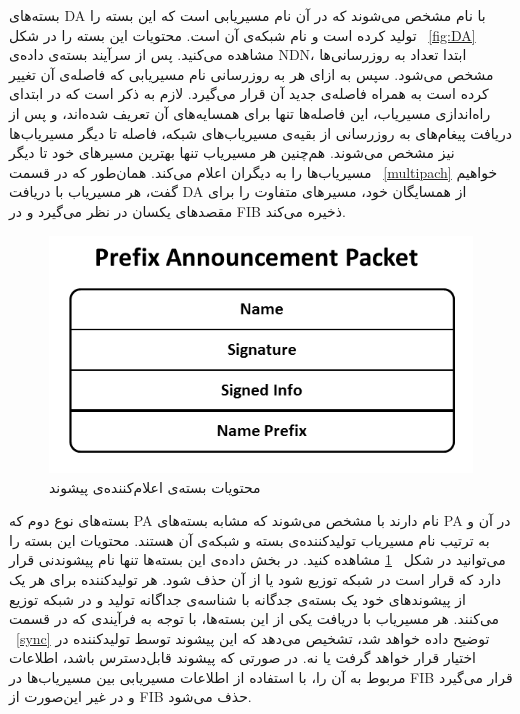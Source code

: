 بسته‌های DA با نام  مشخص می‌شوند که در آن  نام مسیریابی است که این بسته را تولید کرده است و  نام شبکه‌ی آن است. محتویات این بسته را در شکل ~\ref{fig:DA} مشاهده می‌کنید. پس از سرآیند بسته‌ی داده‌ی NDN، ابتدا تعداد به روزرسانی‌ها مشخص می‌شود. سپس به ازای هر به روزرسانی نام مسیریابی که فاصله‌ی آن تغییر کرده است به همراه فاصله‌ی جدید آن قرار می‌گیرد. لازم به ذکر است که در ابتدای راه‌اندازی مسیریاب، این فاصله‌ها تنها برای همسایه‌های آن تعریف شده‌اند، و پس از دریافت پیغام‌های به روزرسانی از بقیه‌ی مسیریاب‌های شبکه، فاصله تا دیگر مسیریاب‌ها نیز مشخص می‌شوند. هم‌چنین هر مسیریاب تنها بهترین مسیرهای خود تا دیگر مسیریاب‌ها را به دیگران اعلام می‌کند. همان‌طور که در قسمت ‍~\ref{multipach} خواهیم گفت، هر مسیریاب با دریافت DA از همسایگان خود، مسیرهای متفاوت را برای مقصد‌های یکسان در نظر می‌گیرد و در FIB ذخیره می‌کند.


\begin{figure}[hb!]
\centering
\includegraphics[scale=0.6]{./resources/figures/PA.png}
\caption{محتویات بسته‌ی اعلام‌کننده‌ی پیشوند}
\label{fig:PA}
\end{figure}

بسته‌های نوع دوم که PA نام دارند با  مشخص می‌شوند که مشابه بسته‌های PA در آن  و  به ترتیب نام مسیریاب تولیدکننده‌ی بسته و شبکه‌ی آن هستند. محتویات این بسته را می‌توانید در شکل ~\ref{fig:PA} مشاهده کنید. در بخش داده‌ی این بسته‌ها تنها نام پیشوندنی قرار دارد که قرار است در شبکه توزیع شود یا از آن حذف شود. هر تولید‌کننده برای هر یک از پیشوند‌های خود یک بسته‌ی جدگانه با شناسه‌ی جداگانه تولید و در شبکه توزیع می‌کنند. هر مسیریاب با دریافت یکی از این بسته‌ها، با توجه به فرآیندی که در قسمت ~\ref{sync} توضیح داده خواهد شد، تشخیص می‌دهد که این پیشوند توسط تولیدکننده در اختیار قرار خواهد گرفت یا نه. در صورتی که پیشوند قابل‌دسترس باشد، اطلاعات مربوط به آن را، با استفاده از اطلاعات مسیریابی بین مسیریاب‌ها در FIB قرار می‌گیرد و در غیر این‌صورت از FIB حذف می‌شود. 


